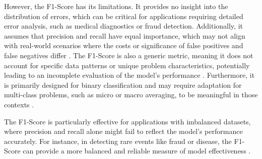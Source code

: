 However, the F1-Score has its limitations. It provides no insight into the distribution of errors, which can be critical for applications requiring detailed error analysis, such as medical diagnostics or fraud detection. Additionally, it assumes that precision and recall have equal importance, which may not align with real-world scenarios where the costs or significance of false positives and false negatives differ \cite{serokell_f1_score_guide}. The F1-Score is also a generic metric, meaning it does not account for specific data patterns or unique problem characteristics, potentially leading to an incomplete evaluation of the model's performance \cite{serokell_f1_score_guide}. Furthermore, it is primarily designed for binary classification and may require adaptation for multi-class problems, such as micro or macro averaging, to be meaningful in those contexts \cite{serokell_f1_score_guide}.

The F1-Score is particularly effective for applications with imbalanced datasets, where precision and recall alone might fail to reflect the model's performance accurately. For instance, in detecting rare events like fraud or disease, the F1-Score can provide a more balanced and reliable measure of model effectiveness \cite{appliedai_evaluation_metrics}.
